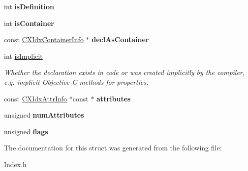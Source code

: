 \begin{DoxyCompactItemize}
\item 
\mbox{\label{structCXIdxDeclInfo_a925e7e3dca5356fdd7d5491a77f79dad}} 
int {\bfseries is\+Definition}
\item 
\mbox{\label{structCXIdxDeclInfo_adfe3f4ae193d95fa63a1982d5253b927}} 
int {\bfseries is\+Container}
\item 
\mbox{\label{structCXIdxDeclInfo_a76cc2299b11b6385f1f2200cd6a6f026}} 
const \hyperlink{structCXIdxContainerInfo}{C\+X\+Idx\+Container\+Info} $\ast$ {\bfseries decl\+As\+Container}
\item 
\mbox{\label{structCXIdxDeclInfo_a111db4f86cbc1334d47bc413058373d6}} 
int \hyperlink{structCXIdxDeclInfo_a111db4f86cbc1334d47bc413058373d6}{is\+Implicit}
\begin{DoxyCompactList}\small\item\em Whether the declaration exists in code or was created implicitly by the compiler, e.\+g. implicit Objective-\/C methods for properties. \end{DoxyCompactList}\item 
\mbox{\label{structCXIdxDeclInfo_ac0b1c1b62c5b12b6493c145b7821966b}} 
const \hyperlink{structCXIdxAttrInfo}{C\+X\+Idx\+Attr\+Info} $\ast$const  $\ast$ {\bfseries attributes}
\item 
\mbox{\label{structCXIdxDeclInfo_ab366b0e67cd492f1a7fa9eb2d19239cf}} 
unsigned {\bfseries num\+Attributes}
\item 
\mbox{\label{structCXIdxDeclInfo_a54c8ca818a9f2ffbfc530d8bd0a61308}} 
unsigned {\bfseries flags}
\end{DoxyCompactItemize}


The documentation for this struct was generated from the following file\+:\begin{DoxyCompactItemize}
\item 
Index.\+h\end{DoxyCompactItemize}
